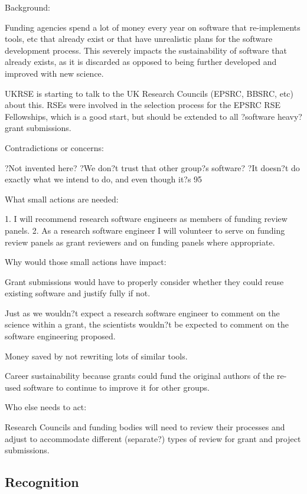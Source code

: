 \documentclass[a4paper,UKenglish]{dagman}
\begin{document}
Background:

Funding agencies spend a lot of money every year on software that re-implements tools, etc that already exist or that have unrealistic plans for the software development process. This severely impacts the sustainability of software that already exists, as it is discarded as opposed to being further developed and improved with new science. 

UKRSE is starting to talk to the UK Research Councils (EPSRC, BBSRC, etc) about this. RSEs were involved in the selection process for the EPSRC RSE Fellowships, which is a good start, but should be extended to all ?software heavy? grant submissions.

Contradictions or concerns:

?Not invented here?
?We don?t trust that other group?s software?
?It doesn?t do exactly what we intend to do, and even though it?s 95%

What small actions are needed:

1.	I will recommend research software engineers as members of funding review panels.
2.	As a research software engineer I will volunteer to serve on funding review panels as grant reviewers and on funding panels where appropriate.

Why would those small actions have impact:

Grant submissions would have to properly consider whether they could reuse existing software and justify fully if not.

Just as we wouldn?t expect a research software engineer to comment on the science within a grant, the scientists wouldn?t be expected to comment on the software engineering proposed.

Money saved by not rewriting lots of similar tools.

Career sustainability because grants could fund the original authors of the re-used software to continue to improve it for other groups.

Who else needs to act:

Research Councils and funding bodies will need to review their processes and adjust to accommodate different (separate?) types of review for grant and project submissions.




\subsection{Recognition}
\end{document}
